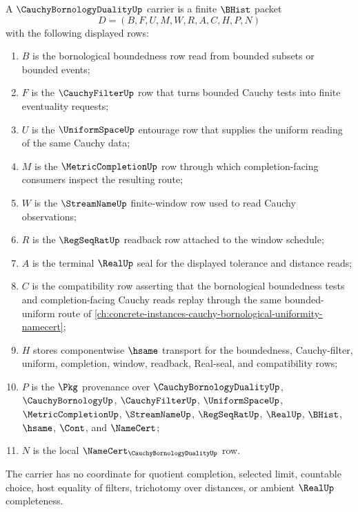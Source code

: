 \begin{definition}
\label{def:cauchy-bornology-duality-carrier}
A $\CauchyBornologyDualityUp$ carrier is a finite $\BHist$ packet
$$
D=(B,F,U,M,W,R,A,C,H,P,N)
$$
with the following displayed rows:
\begin{enumerate}
\item $B$ is the bornological boundedness row read from bounded subsets or bounded events;
\item $F$ is the $\CauchyFilterUp$ row that turns bounded Cauchy tests into finite eventuality requests;
\item $U$ is the $\UniformSpaceUp$ entourage row that supplies the uniform reading of the same Cauchy data;
\item $M$ is the $\MetricCompletionUp$ row through which completion-facing consumers inspect the resulting route;
\item $W$ is the $\StreamNameUp$ finite-window row used to read Cauchy observations;
\item $R$ is the $\RegSeqRatUp$ readback row attached to the window schedule;
\item $A$ is the terminal $\RealUp$ seal for the displayed tolerance and distance reads;
\item $C$ is the compatibility row asserting that the bornological boundedness tests and completion-facing Cauchy reads replay through the same bounded-uniform route of \autoref{ch:concrete-instances-cauchy-bornological-uniformity-namecert};
\item $H$ stores componentwise $\hsame$ transport for the boundedness, Cauchy-filter, uniform, completion, window, readback, Real-seal, and compatibility rows;
\item $P$ is the $\Pkg$ provenance over $\CauchyBornologyDualityUp$, $\CauchyBornologyUp$, $\CauchyFilterUp$, $\UniformSpaceUp$, $\MetricCompletionUp$, $\StreamNameUp$, $\RegSeqRatUp$, $\RealUp$, $\BHist$, $\hsame$, $\Cont$, and $\NameCert$;
\item $N$ is the local $\NameCert_{\CauchyBornologyDualityUp}$ row.
\end{enumerate}
The carrier has no coordinate for quotient completion, selected limit, countable choice, host equality of filters, trichotomy over distances, or ambient $\RealUp$ completeness.
\end{definition}

